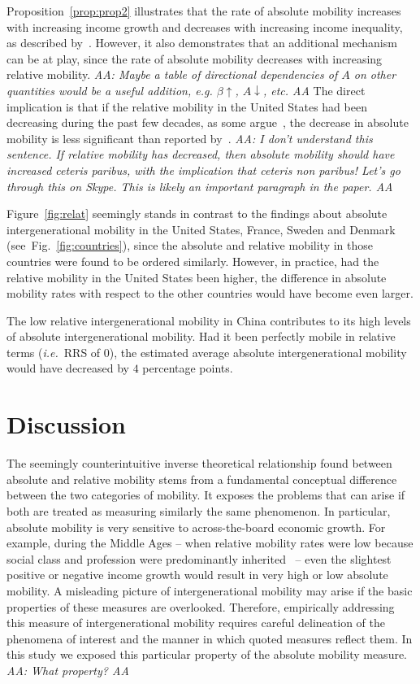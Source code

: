 \documentclass[12pt,a4paper]{article}
\newcommand{\red}[1]{{\color{red} #1}}
\newcommand{\Pref}[1]{Proposition~\ref{prop:#1}}
\newcommand{\ie}{{\it i.e.}\ }
\newcommand{\AAA}[1]{\red{{\it AA: #1 AA}}}
\newcommand{\fref}[1]{Fig.~\ref{fig:#1}}
\newcommand{\Fref}[1]{Figure~\ref{fig:#1}}
\numberwithin{equation}{section}
\begin{document}
\Pref{prop2} illustrates that the rate of absolute mobility increases with increasing income growth and decreases with increasing income inequality, as described by~\citet{chetty2017fading}. However, it also demonstrates that an additional mechanism can be at play, since the rate of absolute mobility decreases with increasing relative mobility. \AAA{Maybe a table of directional dependencies of $A$ on other quantities would be a useful addition, e.g. $\beta\uparrow$, $A\downarrow$, etc.} The direct implication is that if the relative mobility in the United States had been decreasing during the past few decades, as some argue~\citep{aaronson2008intergenerational,putnam2012growing}, the decrease in absolute mobility is less significant than reported by~\citet{chetty2017fading}. \AAA{I don't understand this sentence. If relative mobility has decreased, then absolute mobility should have increased ceteris paribus, with the implication that ceteris non paribus! Let's go through this on Skype. This is likely an important paragraph in the paper.}

\Fref{relat} seemingly stands in contrast to the findings about absolute intergenerational mobility in the United States, France, Sweden and Denmark (see~\fref{countries}), since the absolute and relative mobility in those countries were found to be ordered similarly. However, in practice, had the relative mobility in the United States been higher, the difference in absolute mobility rates with respect to the other countries would have become even larger.

The low relative intergenerational mobility in China contributes to its high levels of absolute intergenerational mobility. Had it been perfectly mobile in relative terms (\ie RRS of $0$), the estimated average absolute intergenerational mobility would have decreased by $4$ percentage points.

\section{Discussion}

The seemingly counterintuitive inverse theoretical relationship found between absolute and relative mobility stems from a fundamental conceptual difference between the two categories of mobility. It exposes the problems that can arise if both are treated as measuring similarly the same phenomenon. In particular, absolute mobility is very sensitive to across-the-board economic growth. For example, during the Middle Ages -- when relative mobility rates were low because social class and profession were predominantly inherited~\citep{goldthorpe1982social,clark2014also} -- even the slightest positive or negative income growth would result in very high or low absolute mobility. A misleading picture of intergenerational mobility may arise if the basic properties of these measures are overlooked. Therefore, empirically addressing this measure of intergenerational mobility requires careful delineation of the phenomena of interest and the manner in which quoted measures reflect them. In this study we exposed this particular property of the absolute mobility measure. \AAA{What property?}
\end{document}
